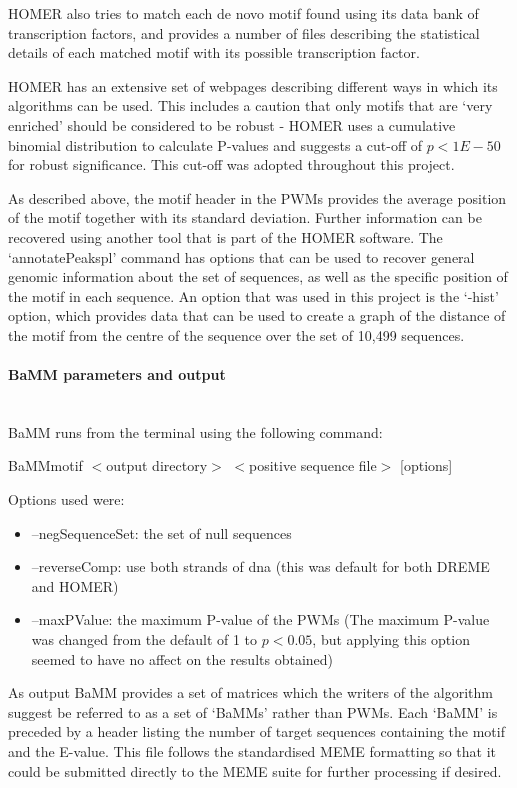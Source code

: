 \documentclass[12pt]{article}
\begin{document}
HOMER also tries to match each de novo motif found using its data bank of transcription factors, and provides a number of files describing the statistical details of each matched motif with its possible transcription factor.

HOMER has an extensive set of webpages describing different ways in which its algorithms can be used. This includes a caution that only motifs that are `very enriched' should be considered to be robust - HOMER uses a cumulative binomial distribution to calculate P-values and suggests a cut-off of $p<1E-50$ for robust significance. This cut-off was adopted throughout this project. 

As described above, the motif header in the PWMs provides the average position of the motif together with its standard deviation. Further information can be recovered using another tool that is part of the HOMER software. The `annotatePeakspl' command has options that can be used to recover general genomic information about the set of sequences, as well as the specific position of the motif in each sequence. An option that was used in this project is the `-hist' option, which provides data that can be used to create a graph of the distance of the motif from the centre of the sequence over the set of 10,499 sequences.

\paragraph{BaMM parameters and output}\mbox{}\\
BaMM runs from the terminal using the following command:
\begin{center}
BaMMmotif $<$output directory$>$ $<$positive sequence file$>$ [options]
\end{center}
Options used were:
\begin{itemize}
\item --negSequenceSet: the set of null sequences
\item --reverseComp: use both strands of dna (this was default for both DREME and HOMER)
\item --maxPValue: the maximum P-value of the PWMs (The maximum P-value was changed from the default of 1 to $p<0.05$, but applying this option seemed to have no affect on the results obtained)
\end{itemize}

As output BaMM provides a set of matrices which the writers of the algorithm suggest be referred to as a set of `BaMMs' rather than PWMs. Each `BaMM' is preceded by a header listing the number of target sequences containing the motif and the E-value. This file follows the standardised MEME formatting so that it could be submitted directly to the MEME suite for further processing if desired.
\end{document}
